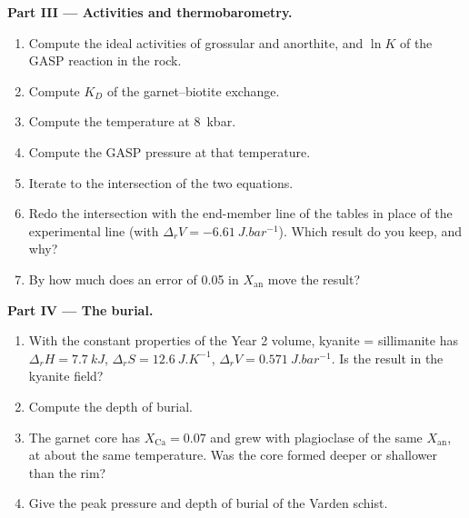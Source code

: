 \begin{problem}
\medskip\noindent\textbf{Part III --- Activities and thermobarometry.}
\begin{enumerate}[resume]
  \item Compute the ideal activities of grossular and anorthite, and $\ln K$
        of the GASP reaction in the rock.
  \item Compute $K_D$ of the garnet--biotite exchange.
  \item Compute the temperature at \qty{8}{kbar}.
  \item Compute the GASP pressure at that temperature.
  \item Iterate to the intersection of the two equations.
  \item Redo the intersection with the end-member line of the tables in place
        of the experimental line (with $\Delta_rV = \qty{-6.61}{J.bar^{-1}}$).
        Which result do you keep, and why?
  \item By how much does an error of 0.05 in $X_{\text{an}}$ move the
        result?
\end{enumerate}

\medskip\noindent\textbf{Part IV --- The burial.}
\begin{enumerate}[resume]
  \item With the constant properties of the Year 2 volume, kyanite =
        sillimanite has $\Delta_rH = \qty{7.7}{kJ}$, $\Delta_rS =
        \qty{12.6}{J.K^{-1}}$, $\Delta_rV = \qty{0.571}{J.bar^{-1}}$. Is the
        result in the kyanite field?
  \item Compute the depth of burial.
  \item The garnet core has $X_{\text{Ca}} = 0.07$ and grew with plagioclase
        of the same $X_{\text{an}}$, at about the same temperature. Was the
        core formed deeper or shallower than the rim?
  \item Give the peak pressure and depth of burial of the Varden schist.
\end{enumerate}
\end{problem}
